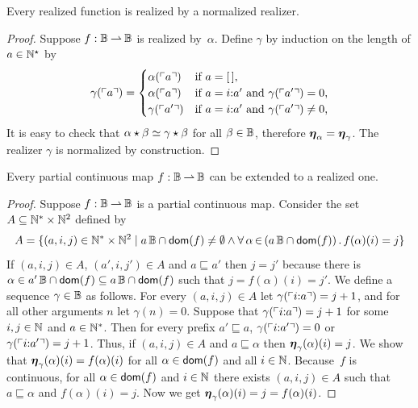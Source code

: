 \begin{lemma}
  \label{lemma:normalized-BB}%
  Every realized function is realized by a normalized realizer.
\end{lemma}

\begin{proof}
  Suppose $f : \mathbb{B} \mathbin{\rightharpoonup} \mathbb{B}$ is realized by~$\alpha$. Define
  $\gamma$ by induction on the length of $a \in \mathbb{N}^{\star}$ by
  \begin{equation*}
    \gamma(\ulcorner a \urcorner) =
    \begin{cases}
      \alpha(\ulcorner a \urcorner) & \text{if $a = [\,]$,}\\
      \alpha(\ulcorner a \urcorner) & \text{if $a = i {:} a'$ and
        $\gamma(\ulcorner a' \urcorner) = 0$,}\\
      \gamma(\ulcorner a' \urcorner) & \text{if $a = i {:} a'$ and
        $\gamma(\ulcorner a' \urcorner) \neq 0$,}
    \end{cases}
  \end{equation*}
  It is easy to check that $\alpha \star \beta \simeq \gamma \star
  \beta$ for all $\beta \in \mathbb{B}$, therefore $\text{\boldmath{$\eta$}}_\alpha =
  \text{\boldmath{$\eta$}}_\gamma$. The realizer $\gamma$ is normalized by construction.
\end{proof}


\begin{theorem}
  \label{th:extension_BB}%
  Every partial continuous map $f: \mathbb{B} \mathbin{\rightharpoonup} \mathbb{B}$ can be extended
  to a realized one.
\end{theorem}

\begin{proof}
  Suppose $f: \mathbb{B} \mathbin{\rightharpoonup} \mathbb{B}$ is a partial continuous map.  Consider
  the set $A \subseteq \mathbb{N}^{*} \times \mathbb{N}^2$ defined by
  \begin{equation*}
     A = \set{(a, i, j) \in \NN^{*} \times \NN^{2} \such
        \basicBB{a} \cap \dom{f} \neq \emptyset \land
        \xall{\alpha}{(\basicBB{a} \cap \dom{f})}{
          f(\alpha)(i) = j
          }
        }
  \end{equation*}
  If $(a, i, j) \in A$, $(a', i, j') \in A$ and $a \sqsubseteq a'$
  then $j = j'$ because there is $\alpha \in a'\,\mathbb{B} \cap
  \mathsf{dom}(f) \subseteq a\,\mathbb{B} \cap \mathsf{dom}(f)$ such that $j =
  f(\alpha)(i) = j'$. We define a sequence $\gamma \in \mathbb{B}$ as
  follows. For every $(a, i, j) \in A$ let
  $\gamma(\ulcorner i {:} a \urcorner) = j + 1$, and for all other
  arguments $n$ let $\gamma(n) = 0$. Suppose that
  $\gamma(\ulcorner i {:} a \urcorner) = j + 1$ for some $i, j \in \mathbb{N}$
  and $a \in \mathbb{N}^{*}$. Then for every prefix $a' \sqsubseteq a$,
  $\gamma(\ulcorner i {:} a' \urcorner) = 0$ or
  $\gamma(\ulcorner i {:} a' \urcorner) = j + 1$. Thus, if $(a, i, j) \in
  A$ and $a \sqsubseteq \alpha$ then $\text{\boldmath{$\eta$}}_{\gamma}(\alpha)(i) = j$.
  We show that $\text{\boldmath{$\eta$}}_{\gamma}(\alpha)(i) = f(\alpha)(i)$ for all
  $\alpha \in \mathsf{dom}(f)$ and all $i \in \mathbb{N}$. Because~$f$ is continuous,
  for all $\alpha \in \mathsf{dom}(f)$ and $i \in \mathbb{N}$ there exists $(a, i, j)
  \in A$ such that $a \sqsubseteq \alpha$ and $f(\alpha)(i) = j$. Now
  we get
  $
    \text{\boldmath{$\eta$}}_{\gamma}(\alpha)(i)
    = j
    = f(\alpha)(i)
  $.
\end{proof}


